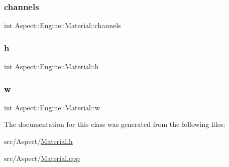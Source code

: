 \subsubsection{\texorpdfstring{channels}{channels}}
{\footnotesize\ttfamily int Aspect\+::\+Engine\+::\+Material\+::channels}

\mbox{\label{class_aspect_1_1_engine_1_1_material_a495fcbe4e64c1814971cd9d815dd0e16}} 
\subsubsection{\texorpdfstring{h}{h}}
{\footnotesize\ttfamily int Aspect\+::\+Engine\+::\+Material\+::h}

\mbox{\label{class_aspect_1_1_engine_1_1_material_a2c52f153e9878530ae68627c9a1f16be}} 
\subsubsection{\texorpdfstring{w}{w}}
{\footnotesize\ttfamily int Aspect\+::\+Engine\+::\+Material\+::w}



The documentation for this class was generated from the following files\+:\begin{DoxyCompactItemize}
\item 
src/\+Aspect/\mbox{\hyperlink{_material_8h}{Material.\+h}}\item 
src/\+Aspect/\mbox{\hyperlink{_material_8cpp}{Material.\+cpp}}\end{DoxyCompactItemize}
